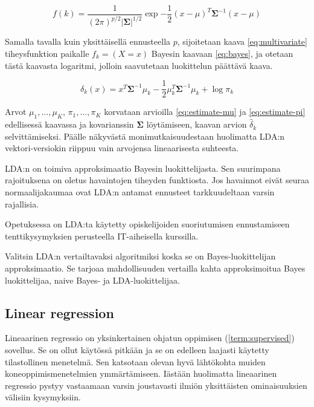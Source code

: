 \documentclass[finnish,twoside,openright]{HYgraduMLDS}
\begin{document}
\begin{equation} \label{eq:multivariate}
    f(k) = \frac{1}{(2\pi)^{p/2} |\pmb{\Sigma}|^{1/2}} \exp{-\frac{1}{2} (x - \mu)^T \pmb{\Sigma}^{-1} (x - \mu)}
\end{equation}

Samalla tavalla kuin yksittäisellä ennusteella $p$, sijoitetaan kaava \ref{eq:multivariate} tiheysfunktion paikalle $f_k = (X = x)$ Bayesin kaavaan \ref{eq:bayes}, ja otetaan tästä kaavasta logaritmi, jolloin saavutetaan luokittelun päättävä kaava.

\begin{equation}
    \delta_k(x) = x^T \pmb{\Sigma}^{-1} \mu_k - \frac{1}{2} \mu_k^T \pmb{\Sigma}^{-1} \mu_k + \log \pi_k
\end{equation}

Arvot $\mu_1, \dots, \mu_K$, $\pi_1, \dots, \pi_K$ korvataan arvioilla \ref{eq:estimate-mu} ja \ref{eq:estimate-pi} edellisessä kaavassa ja kovarianssin $\pmb{\Sigma}$ löytämiseen, kaavan arvion $\hat{\delta}_k$ selvittämiseksi. Päälle näkyvästä monimutkaisuudestaan huolimatta LDA:n vektori-versiokin riippuu vain arvojensa lineaarisesta suhteesta.

LDA:n on toimiva approksimaatio Bayesin luokittelijasta\cite{james2013ISLR}. Sen suurimpana rajoituksena on oletus havaintojen tiheyden funktiosta. Jos havainnot eivät seuraa normaalijakaumaa ovat LDA:n antamat ennusteet tarkkuudeltaan varsin rajallisia.

Opetuksessa on LDA:ta käytetty opiskelijoiden suoriutumisen ennustamiseen tenttikysymyksien perusteella\cite{7265316} IT-aiheisella kurssilla. 

Valitsin LDA:n vertailtavaksi algoritmiksi koska se on Bayes-luokittelijan approksimaatio. Se tarjoaa mahdollisuuden vertailla kahta approksimoitua Bayes luokittelijaa, naive Bayes- ja LDA-luokittelijaa.


\subsection{Linear regression}

Lineaarinen regressio on yksinkertainen ohjatun oppimisen (\ref{term:supervised}) sovellus\cite{james2013ISLR}. Se on ollut käytössä pitkään ja se on edelleen laajasti käytetty tilastollinen menetelmä. Sen katsotaan olevan hyvä lähtökohta muiden koneoppimismenetelmien ymmärtämiseen. Iästään huolimatta lineaarinen regressio pystyy vastaamaan varsin joustavasti ilmiön yksittäisten ominaisuuksien välisiin kysymyksiin. 
\end{document}
